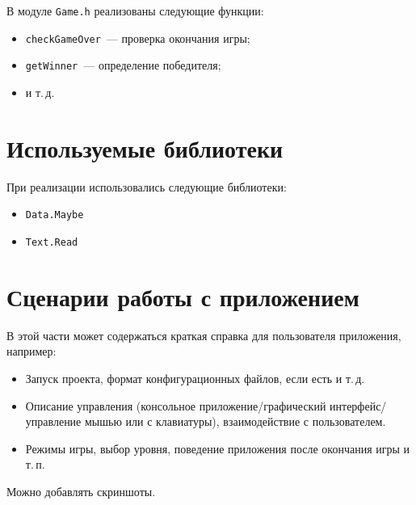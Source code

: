 \documentclass[oneside,final,14pt]{extarticle}
\begin{document}
В модуле \texttt{Game.h} реализованы следующие функции:
\begin{itemize}
    \item \texttt{checkGameOver}~--- проверка окончания игры;
    \item \texttt{getWinner}~--- определение победителя;
    \item и т.\,д.
\end{itemize}


\section{Используемые библиотеки}

При реализации использовались следующие библиотеки:
\begin{itemize}
    \item \texttt{Data.Maybe}
    \item \texttt{Text.Read} 
\end{itemize}

\section{Сценарии работы с приложением}

В этой части может содержаться краткая справка для пользователя приложения,
например:
\begin{itemize}
    \item Запуск проекта, формат конфигурационных файлов, если есть и т.\,д.
    \item Описание управления (консольное приложение/графический интерфейс/управление
          мышью или с клавиатуры), взаимодействие с пользователем.
    \item Режимы игры, выбор уровня, поведение приложения после окончания игры и т.\,п.
\end{itemize}

Можно добавлять скриншоты.
\end{document}
